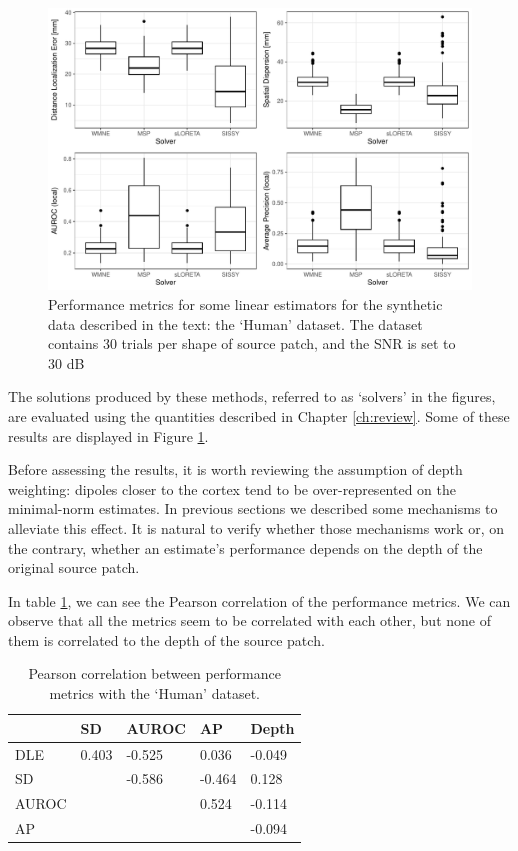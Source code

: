 \begin{figure}
    \centering
    \includegraphics[width=0.9\linewidth]{img_stats/plot_EvalMetrics_Protocol04_30ALL.pdf}
    \caption{Performance metrics for some linear estimators for the 
    synthetic data described in the text: the `Human' dataset. The dataset contains 30 trials per shape of source patch, and the SNR is set to 30 dB}
    \label{fig:results1}
\end{figure}

The solutions produced by these methods, referred to as `solvers' in the figures, are evaluated using the quantities described in Chapter \ref{ch:review}.
%
Some of these results are displayed in Figure \ref{fig:results1}.

Before assessing the results, it is worth reviewing the assumption of depth weighting: dipoles closer to the cortex tend to be over-represented on the minimal-norm estimates.
%
In previous sections we described some mechanisms to alleviate this effect.
%
It is natural to verify whether those mechanisms work or, on the contrary, whether an estimate's performance depends on the depth of the original source patch.

In table \ref{tab:corr}, we can see the Pearson correlation of the performance metrics.
%
We can observe that all the metrics seem to be correlated with each other, but none of them is correlated to the depth of the source patch.

\begin{table}[]
\centering
\begin{tabular}{@{}lllll@{}}
\toprule
      & SD    & AUROC & AP    & Depth  \\
\midrule
DLE   & 0.403 & -0.525 & 0.036  & -0.049 \\
SD    &       & -0.586 & -0.464 & 0.128  \\
AUROC &       &        & 0.524  & -0.114 \\
AP    &       &        &        & -0.094 \\
\bottomrule
\end{tabular}
\caption{Pearson correlation between performance metrics with the `Human' dataset.}
\label{tab:corr}
\end{table}

